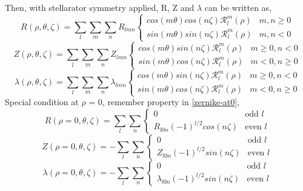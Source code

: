 Then, with stellarator symmetry applied, R, Z and $\lambda$ can be written as,
\begin{equation}
    R(\rho,\theta,\zeta) = \sum_{l}^{}\sum_{m}^{}\sum_{n}^{} R_{lmn} \begin{cases}
        cos(m\theta)cos(n\zeta) \mathcal{R}_l^m (\rho) & m,n \geq 0  \\
        sin(m\theta)sin(n\zeta) \mathcal{R}_l^m (\rho) & m,n < 0
    \end{cases}
\end{equation}
\begin{equation}
    Z(\rho,\theta,\zeta) = \sum_{l}^{}\sum_{m}^{}\sum_{n}^{} Z_{lmn} \begin{cases}
        cos(m\theta)sin(n\zeta) \mathcal{R}_l^m (\rho) & m \geq 0, n < 0 \\
        sin(m\theta)cos(n\zeta) \mathcal{R}_l^m (\rho) & m< 0, n \geq 0
    \end{cases}
\end{equation}
\begin{equation}
    \lambda(\rho,\theta,\zeta) = \sum_{l}^{}\sum_{m}^{}\sum_{n}^{} \lambda_{lmn} \begin{cases}
        cos(m\theta)sin(n\zeta) \mathcal{R}_l^m (\rho) & m \geq 0, n < 0 \\
        sin(m\theta)cos(n\zeta) \mathcal{R}_l^m (\rho) & m< 0, n \geq 0
    \end{cases}
\end{equation}
Special condition at $\rho$ = 0, remember property in \ref{zernike-at0},
\begin{equation}
    R(\rho=0,\theta,\zeta) = \sum_{l}\sum_{n} \begin{cases}
        0 & \text{odd $l$} \\
        R_{l0n} (-1)^{l/2}  cos(n\zeta) & \text{even $l$}
    \end{cases}
\end{equation}
\begin{equation}
    Z(\rho=0,\theta,\zeta) = -\sum_{l}\sum_{n} \begin{cases}
        0 & \text{odd $l$} \\
        Z_{l0n} (-1)^{l/2}sin(n\zeta) & \text{even $l$}
    \end{cases}
\end{equation}
\begin{equation}
    \lambda(\rho=0,\theta,\zeta) = -\sum_{l} \sum_{n} \begin{cases}
        0 & \text{odd $l$} \\
        \lambda_{l0n} (-1)^{l/2} sin(n\zeta) & \text{even $l$}
    \end{cases} 
\end{equation}
